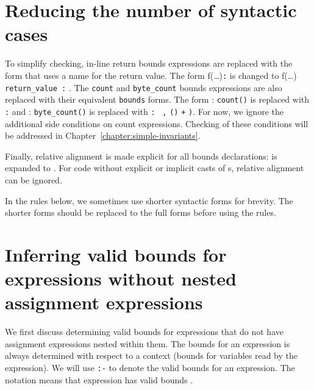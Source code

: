 \section{Reducing the number of syntactic cases}\label{reducing-the-number-of-syntactic-cases}

To simplify checking, in-line return bounds expressions are replaced
with the form that uses a name for the return value. The form
f(\ldots{})\texttt{:}  is changed to f(\ldots{}) 
\texttt{return\_value :} . The \texttt{count} and
\texttt{byte\_count} bounds expressions are also replaced with their
equivalent \texttt{bounds} forms. The form  :
\texttt{count(}\texttt{)} is replaced with  \texttt{:}
 and  :
\texttt{byte\_count(}\texttt{)} is replaced with 
\texttt{:} \arrayptrchar\
\texttt{,} \texttt{(\arrayptrchar )}
\var{x} \texttt{+} \texttt{)}. For now, we ignore the
additional side conditions on count expressions. Checking of these
conditions will be addressed in Chapter~\ref{chapter:simple-invariants}.

Finally, relative alignment is made explicit for all bounds
declarations:  is expanded to
.
For code without explicit or implicit casts of \arrayptr s, relative
alignment can be ignored.

In the rules below, we sometimes use shorter syntactic forms for
brevity. The shorter forms should be replaced to the full forms before
using the rules.

\section{Inferring valid bounds for expressions without nested assignment expressions}\label{section:inferring-expression-bounds}

We first discuss determining valid bounds for expressions that do not
have assignment expressions nested within them. The bounds for an
expression is always determined with respect to a context (bounds for
variables read by the expression). We will use \texttt{:-} to denote the
valid bounds for an expression. The notation 
means that expression \var{e} has valid bounds \var{bounds-exp}.

